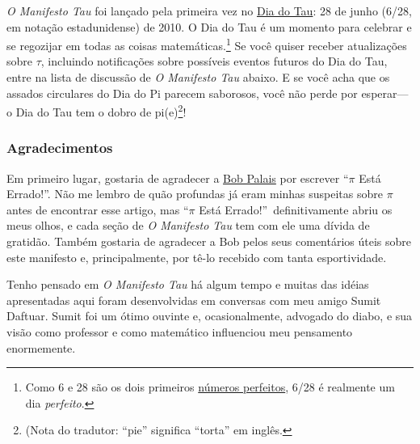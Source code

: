 \emph{O Manifesto Tau} foi lançado pela primeira vez no \href{https://tauday.com/}{Dia do Tau}: 28 de junho (6/28, em notação estadunidense) de 2010. O Dia do Tau é um momento para celebrar e se regozijar em todas as coisas matemáticas.\footnote{Como 6 e 28 são os dois primeiros \href{https://pt.wikipedia.org/wiki/N%C3%BAmero_perfeito}{números perfeitos}, 6/28 é realmente um dia \emph{perfeito}.} Se você quiser receber atualizações sobre $\tau$, incluindo notificações sobre possíveis eventos futuros do Dia do Tau, entre na lista de discussão de \emph{O Manifesto Tau} abaixo. E se você acha que os assados ​​circulares do Dia do Pi parecem saborosos, você não perde por esperar---o Dia do Tau tem o dobro de pi(e)\footnote{ (Nota do tradutor: ``pie'' significa ``torta'' em inglês.}!


  \subsubsection{Agradecimentos} %
  \label{sec:acknowledgments}

Em primeiro lugar, gostaria de agradecer a \href{https://www.math.utah.edu/~palais}{Bob Palais} por escrever ``$\pi$ Está Errado!''. Não me lembro de quão profundas já eram minhas suspeitas sobre $\pi$ antes de encontrar esse artigo, mas ``$\pi$ Está Errado!''\ definitivamente abriu os meus olhos, e cada seção de \emph{O Manifesto Tau} tem com ele uma dívida de gratidão. Também gostaria de agradecer a Bob pelos seus comentários úteis sobre este manifesto e, principalmente, por tê-lo recebido com tanta esportividade.

Tenho pensado em \emph{O Manifesto Tau} há algum tempo e muitas das idéias apresentadas aqui foram desenvolvidas em conversas com meu amigo Sumit Daftuar. Sumit foi um ótimo ouvinte e, ocasionalmente, advogado do diabo, e sua visão como professor e como matemático influenciou meu pensamento enormemente.

